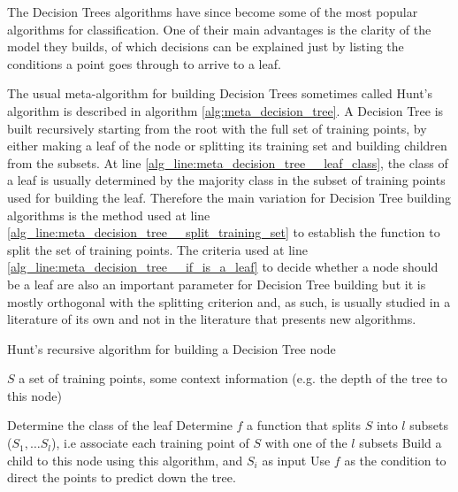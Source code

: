 The Decision Trees algorithms have since become some of the most popular algorithms for classification. One of their main advantages is the clarity of the model they builds, of which decisions can be explained just by listing the conditions a point goes through to arrive to a leaf.

The usual meta-algorithm for building Decision Trees sometimes called Hunt's algorithm \cite{Priyanka2020_decision_trees_survey} is described in algorithm \ref{alg:meta_decision_tree}. A Decision Tree is built recursively starting from the root with the full set of training points, by either making a leaf of the node or splitting its training set and building children from the subsets.
At line \ref{alg_line:meta_decision_tree__leaf_class}, the class of a leaf is usually determined by the majority class in the subset of training points used for building the leaf. Therefore the main variation for Decision Tree building algorithms is the method used at line \ref{alg_line:meta_decision_tree__split_training_set} to establish the function to split the set of training points. The criteria used at line \ref{alg_line:meta_decision_tree__if_is_a_leaf} to decide whether a node should be a leaf are also an important parameter for Decision Tree building but it is mostly orthogonal with the splitting criterion and, as such, is usually studied in a literature of its own and not in the literature that presents new algorithms.

\begin{algorithm}
\caption{Hunt's recursive algorithm for building a Decision Tree node}
\label{alg:meta_decision_tree}
\begin{algorithmic}[1]
    \Require $S$ a set of training points, some context information (e.g. the depth of the tree to this node)
    
        \State Determine the class of the leaf \label{alg_line:meta_decision_tree__leaf_class}
    \Else
        \State Determine $f$ a function that splits $S$ into $l$ subsets ($S_1, \dots S_l$), i.e associate each training point of $S$ with one of the $l$ subsets\label{alg_line:meta_decision_tree__split_training_set}
            \State Build a child to this node using this algorithm, and $S_i$ as input\label{alg_line:meta_decision_tree__build_children}
        \EndFor
        \State Use $f$ as the condition to direct the points to predict down the tree.
    \EndIf
\end{algorithmic}
\end{algorithm}

